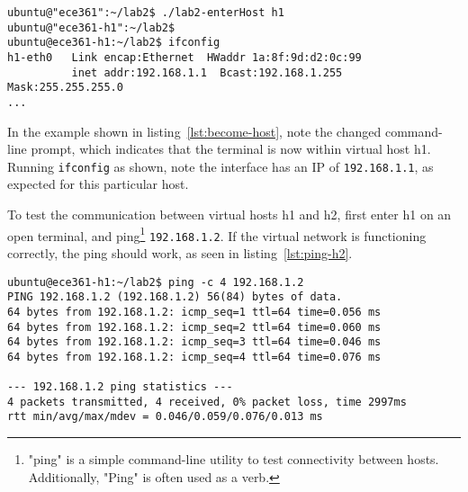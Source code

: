 \documentclass[11pt]{article}
\begin{document}
\begin{lstlisting}[style=ece361shell, caption={Entering into one of the virtual hosts.}, label={lst:become-host}]
ubuntu@"ece361":~/lab2$ ./lab2-enterHost h1
ubuntu@"ece361-h1":~/lab2$
ubuntu@ece361-h1:~/lab2$ ifconfig
h1-eth0   Link encap:Ethernet  HWaddr 1a:8f:9d:d2:0c:99
          inet addr:192.168.1.1  Bcast:192.168.1.255  Mask:255.255.255.0
...
\end{lstlisting}

In the example shown in listing~\ref{lst:become-host}, note the changed command-line prompt, which indicates that the terminal is now within virtual host h1.
Running \texttt{ifconfig} as shown, note the interface has an IP of \texttt{192.168.1.1}, as expected for this particular host.


To test the communication between virtual hosts h1 and h2, first enter h1 on an open terminal, and ping\footnote{"ping" is a simple command-line utility to test connectivity between hosts. Additionally, "Ping" is often used as a verb.} \texttt{192.168.1.2}.
If the virtual network is functioning correctly, the ping should work, as seen in listing~\ref{lst:ping-h2}.

\begin{lstlisting}[style=ece361shell, caption={Pinging h2 from within h1.}, label={lst:ping-h2}]
ubuntu@ece361-h1:~/lab2$ ping -c 4 192.168.1.2
PING 192.168.1.2 (192.168.1.2) 56(84) bytes of data.
64 bytes from 192.168.1.2: icmp_seq=1 ttl=64 time=0.056 ms
64 bytes from 192.168.1.2: icmp_seq=2 ttl=64 time=0.060 ms
64 bytes from 192.168.1.2: icmp_seq=3 ttl=64 time=0.046 ms
64 bytes from 192.168.1.2: icmp_seq=4 ttl=64 time=0.076 ms

--- 192.168.1.2 ping statistics ---
4 packets transmitted, 4 received, 0% packet loss, time 2997ms
rtt min/avg/max/mdev = 0.046/0.059/0.076/0.013 ms
\end{lstlisting}
\end{document}
